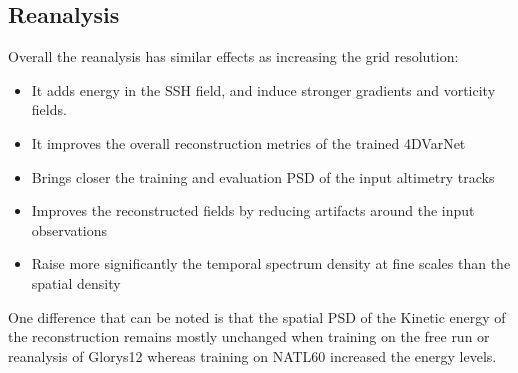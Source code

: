 \documentclass[draft]{agujournal2019}
\begin{document}
\subsection{Reanalysis}
\label{ssec:reanalysis}
Overall the reanalysis has similar effects as increasing the grid resolution:
\begin{itemize}
    \item It adds energy in the SSH field, and induce stronger gradients and vorticity fields.
    \item It improves the overall reconstruction metrics of the trained 4DVarNet
    \item Brings closer the training and evaluation PSD of the input altimetry tracks
    \item Improves the reconstructed fields by reducing artifacts around the input observations
    \item Raise more significantly the temporal spectrum density at fine scales than the spatial density 
\end{itemize}

One difference that can be noted is that the spatial PSD of the Kinetic energy of the reconstruction remains mostly unchanged when training on the free run or reanalysis of Glorys12 whereas training on NATL60 increased the energy levels. 
\end{document}
